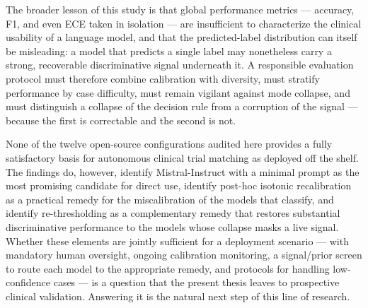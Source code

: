 The broader lesson of this study is that global performance metrics 
--- accuracy, F1, and even ECE taken in isolation --- are insufficient 
to characterize the clinical usability of a language model, and that 
the predicted-label distribution can itself be misleading: a model that 
predicts a single label may nonetheless carry a strong, recoverable 
discriminative signal underneath it. A responsible evaluation protocol 
must therefore combine calibration with diversity, must stratify 
performance by case difficulty, must remain vigilant against mode 
collapse, and must distinguish a collapse of the decision rule from a 
corruption of the signal --- because the first is correctable and the 
second is not.

None of the twelve open-source configurations audited here provides a 
fully satisfactory basis for autonomous clinical trial matching as 
deployed off the shelf. The findings do, however, identify 
Mistral-Instruct with a minimal prompt as the most promising candidate 
for direct use, identify post-hoc isotonic recalibration as a practical 
remedy for the miscalibration of the models that classify, and identify 
re-thresholding as a complementary remedy that restores substantial 
discriminative performance to the models whose collapse masks a live 
signal. Whether these elements are jointly sufficient for a deployment 
scenario --- with mandatory human oversight, ongoing calibration 
monitoring, a signal/prior screen to route each model to the 
appropriate remedy, and protocols for handling low-confidence cases --- 
is a question that the present thesis leaves to prospective clinical 
validation. Answering it is the natural next step of this line of 
research.